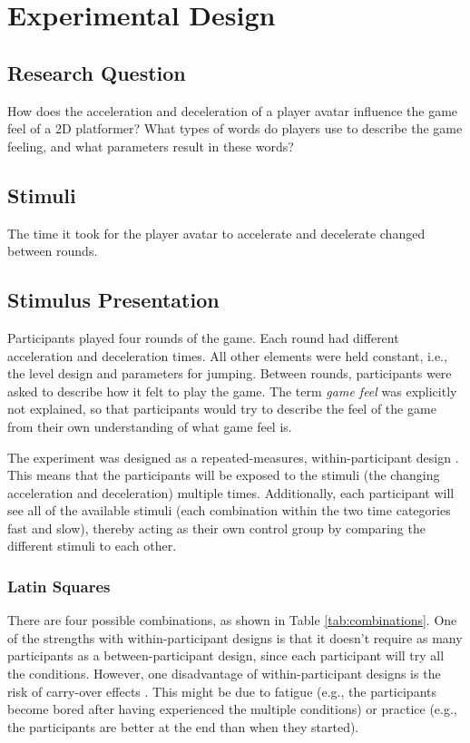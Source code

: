 \section{Experimental Design} \label{experimentalDesign}
\subsection{Research Question}
How does the acceleration and deceleration of a player avatar influence the game feel of a 2D platformer? What types of words do players use to describe the game feeling, and what parameters result in these words?

\subsection{Stimuli}
The time it took for the player avatar to accelerate and decelerate changed between rounds.

\subsection{Stimulus Presentation}
Participants played four rounds of the game. Each round had different acceleration and deceleration times. All other elements were held constant, i.e., the level design and parameters for jumping. Between rounds, participants were asked to describe how it felt to play the game. The term \textit{game feel} was explicitly not explained, so that participants would try to describe the feel of the game from their own understanding of what game feel is.

The experiment was designed as a repeated-measures, within-participant design \cite{cunningham}. This means that the participants will be exposed to the stimuli (the changing acceleration and deceleration) multiple times. Additionally, each participant will see all of the available stimuli (each combination within the two time categories fast and slow), thereby acting as their own control group by comparing the different stimuli to each other.

\subsubsection{Latin Squares} \label{latinSection}
There are four possible combinations, as shown in Table \ref{tab:combinations}. One of the strengths with within-participant designs is that it doesn't require as many participants as a between-participant design, since each participant will try all the conditions. However, one disadvantage of within-participant designs is the risk of carry-over effects \cite{experimental1}. This might be due to fatigue (e.g., the participants become bored after having experienced the multiple conditions) or practice (e.g., the participants are better at the end than when they started).

